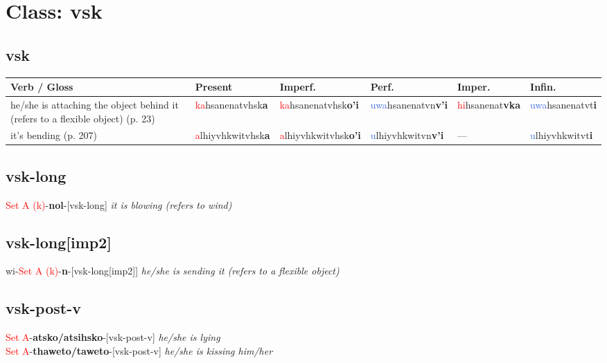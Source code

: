 \documentclass[oneside,openany]{book}%
\begin{document}
\section*{Class: vsk}%
%
\needspace{1in}%
\subsection*{vsk}%
\begin{tabularx}{\textwidth}{>{\hsize=1.5\hsize\RaggedRight}X >{\hsize=0.9\hsize}X >{\hsize=0.9\hsize}X >{\hsize=0.9\hsize}X >{\hsize=0.9\hsize}X >{\hsize=0.9\hsize}X}%
\toprule%
\textbf{Verb / Gloss}&\textbf{Present}&\textbf{Imperf.}&\textbf{Perf.}&\textbf{Imper.}&\textbf{Infin.}\\%
\midrule%
he/she is attaching the object behind it (refers to a flexible object) (p. 23)&\textcolor{Red}{ka}hsanenatvhsk\textbf{a}&\textcolor{Red}{ka}hsanenatvhsk\textbf{o'i}&\textcolor{RoyalBlue}{uwa}hsanenatvn\textbf{v'i}&\textcolor{Red}{hi}hsanenat\textbf{vka}&\textcolor{RoyalBlue}{uwa}hsanenatvt\textbf{i}\\%
it's bending (p. 207)&\textcolor{Red}{a}lhiyvhkwitvhsk\textbf{a}&\textcolor{Red}{a}lhiyvhkwitvhsk\textbf{o'i}&\textcolor{RoyalBlue}{u}lhiyvhkwitvn\textbf{v'i}&---&\textcolor{RoyalBlue}{u}lhiyvhkwitvt\textbf{i}\\%
\bottomrule%
\end{tabularx}%
\vspace{1em}%
\needspace{1in}%
\subsection*{vsk-long}%
\textcolor{Red}{Set A (k)}{-}\textbf{nol}{-}[vsk-long] \textit{ it is blowing (refers to wind)} \\%
\vspace{1em}%
\needspace{1in}%
\subsection*{vsk-long[imp2]}%
wi{-}\textcolor{Red}{Set A (k)}{-}\textbf{n}{-}[vsk-long[imp2]] \textit{ he/she is sending it (refers to a flexible object)} \\%
\vspace{1em}%
\needspace{1in}%
\subsection*{vsk-post-v}%
\textcolor{Red}{Set A}{-}\textbf{atsko/atsihsko}{-}[vsk-post-v] \textit{ he/she is lying} \\%
\textcolor{Red}{Set A}{-}\textbf{thaweto/taweto}{-}[vsk-post-v] \textit{ he/she is kissing him/her} \\%
\vspace{1em}%
\needspace{1in}%
\end{document}
